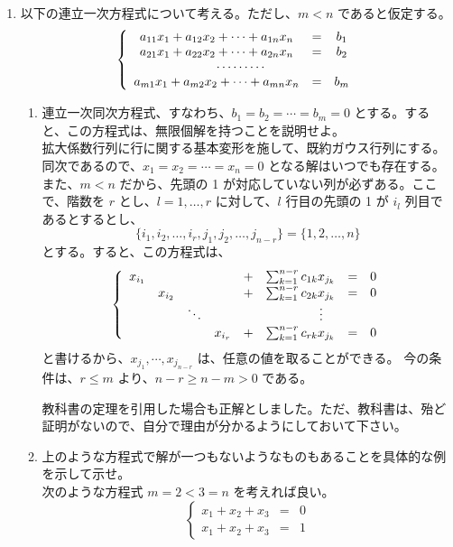\begin{enumerate}
\item 以下の連立一次方程式について考える。ただし、$m<n$ であると仮定する。
$$\left\{\begin{array}{ccc}
a_{11}x_1 + a_{12}x_2 + \cdots + a_{1n}x_n & = & b_1\\
a_{21}x_1 + a_{22}x_2 + \cdots + a_{2n}x_n & = & b_2\\
\multicolumn{3}{c}{\cdots\cdots\cdots} \\
a_{m1}x_1 + a_{m2}x_2 + \cdots + a_{mn}x_n & = & b_m
\end{array}\right.$$
\begin{enumerate}
\item 連立一次同次方程式、すなわち、$b_1 = b_2 = \cdots = b_m = 0$ とする。すると、この方程式は、無限個解を持つことを説明せよ。\\
\sol
拡大係数行列に行に関する基本変形を施して、既約ガウス行列にする。同次であるので、$x_1 = x_2 = \cdots = x_n = 0$ となる解はいつでも存在する。また、$m<n$ だから、先頭の 1 が対応していない列が必ずある。ここで、階数を $r$ とし、$l = 1,\ldots, r$ に対して、$l$ 行目の先頭の 1 が $i_l$ 列目であるとするとし、
$$\{i_1,i_2,\ldots,i_r,j_1,j_2,\ldots,j_{n-r}\} = \{1,2,\ldots,n\}$$
とする。すると、この方程式は、
$$\left\{\begin{array}{cccccccc}
x_{i_1} & & & & + & \sum_{k=1}^{n-r}c_{1k}x_{j_k} & = & 0\\
 & x_{i_2} & & & + & \sum_{k=1}^{n-r}c_{2k}x_{j_k} & = & 0\\
  & & \ddots & &  & \multicolumn{3}{c}{\vdots} \\
  & & & x_{i_r} & + & \sum_{k=1}^{n-r}c_{rk}x_{j_k} & = & 0
\end{array}\right.$$
と書けるから、$x_{j_1},\cdots, x_{j_{n-r}}$ は、任意の値を取ることができる。
今の条件は、$r\leq m$ より、$n-r \geq n-m > 0$ である。

教科書の定理を引用した場合も正解としました。ただ、教科書は、殆ど証明がないので、自分で理由が分かるようにしておいて下さい。

\item 上のような方程式で解が一つもないようなものもあることを具体的な例を示して示せ。\\
\sol 次のような方程式 $m = 2<3 = n$ を考えれば良い。
$$\left\{\begin{array}{ccc}
x_1 + x_2 + x_3 & = & 0\\
x_1 + x_2 + x_3 & = & 1
\end{array}\right.$$
\end{enumerate}
\end{enumerate}

